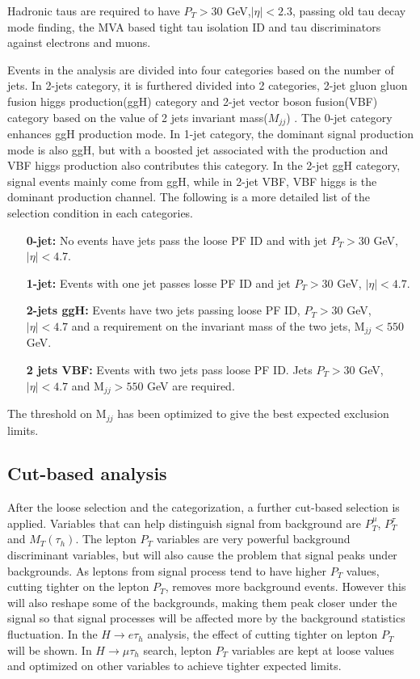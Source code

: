 Hadronic taus are required to have $P_T>30$ GeV,$|\eta|<2.3$, passing old tau decay mode finding, the MVA based tight tau isolation ID and tau discriminators against electrons and muons. %


Events in the analysis are divided into four categories based on the number of jets. In 2-jets category, it is furthered divided into 2 categories,  2-jet gluon gluon fusion higgs production(ggH) category and 2-jet vector boson fusion(VBF) category based on the value of 2 jets invariant mass($M_{jj}$) . The 0-jet category enhances ggH production mode. In 1-jet category, the dominant signal production mode is also ggH, but with a boosted jet associated with the production and VBF higgs production also contributes this category. In the 2-jet ggH category, signal events mainly come from ggH, while in 2-jet VBF, VBF higgs is the dominant production channel.  The following is a more detailed list of the selection condition in each categories.

\begin{enumerate}
\item[{\bf 0-jet:}] No events have jets pass the loose PF ID and  with jet $P_T>30$ GeV, $|\eta|<4.7$.
\item[{\bf 1-jet:}] Events with one jet passes losse PF ID and jet $P_T>30$ GeV, $|\eta|<4.7$.
\item [{\bf 2-jets ggH:}] Events have two jets passing loose PF ID, $P_T>30$ GeV, $|\eta|<4.7$ and a requirement on the invariant mass of the two jets, $\textrm{M}_{jj}<550$ GeV. 
\item [{\bf 2 jets VBF:}] Events with two jets pass loose PF ID. Jets $P_T>30$ GeV, $|\eta|<4.7$ and $\textrm{M}_{jj}>550$ GeV are required. 
\end{enumerate} The threshold on $\textrm{M}_{jj}$ has been optimized to give the best expected exclusion limits.


\subsection{Cut-based analysis}
After the loose selection and the categorization, a further cut-based selection is applied. Variables that can help distinguish signal from background are $P_{T}^{\mu}$, $P_{T}^{\tau}$ and $M_{T}(\tau_{h})$. The lepton $P_{T}$ variables are very powerful background discriminant variables, but will also cause the problem that signal peaks under backgrounds. As leptons from signal process  tend to have higher $P_{T}$ values, cutting tighter on the lepton $P_{T}$, removes more background events. However this will also reshape some of the backgrounds, making them peak closer under the signal so that signal processes will be affected more by the background statistics fluctuation. In the $H\rightarrow e\tau_h$ analysis, the effect of cutting tighter on lepton $P_{T}$ will be shown. In $H\rightarrow\mu\tau_h$ search, lepton $P_{T}$ variables are kept at loose values and optimized on other variables to achieve tighter expected limits. 

